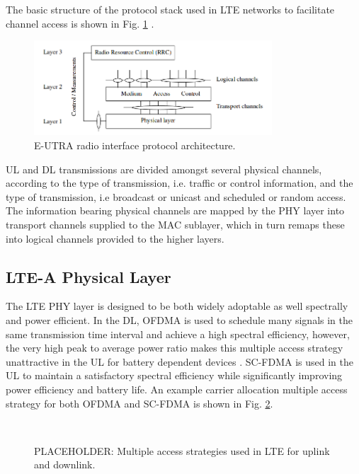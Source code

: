 The basic structure of the protocol stack used in LTE networks to facilitate channel access is shown in Fig. \ref{figs:stack} \cite{tr36201}.
\begin{figure}[!ht]
	\centering
	\includegraphics[width=3.5in]{figures3/protocolStack}
	\caption{E-UTRA radio interface protocol architecture.}
	\label{figs:stack}
\end{figure}
UL and DL transmissions are divided amongst several physical channels, according to the type of transmission, i.e. traffic or control information, and the type of transmission, i.e broadcast or unicast and scheduled or random access. The information bearing physical channels are mapped by the PHY layer into transport channels supplied to the MAC sublayer, which in turn remaps these into logical channels provided to the higher layers. 

\subsection{LTE-A Physical Layer}
\label{lte-phy}
The LTE PHY layer is designed to be both widely adoptable as well spectrally and power efficient.  In the DL, OFDMA is used to schedule many signals in the same transmission time interval and achieve a high spectral efficiency, however, the very high peak to average power ratio makes this multiple access strategy unattractive in the UL for battery dependent devices \cite{tr36201}\cite{tr36211}.  SC-FDMA is used in the UL to maintain a satisfactory spectral efficiency while significantly improving power efficiency and battery life. An example carrier allocation multiple access strategy for both OFDMA and SC-FDMA is shown in Fig. \ref{lte:of-sc-fdma}.

\begin{figure}[!ht] 
	\centering
	\\
	\caption{PLACEHOLDER: Multiple access strategies used in LTE for uplink and downlink.}
	\label{lte:of-sc-fdma}
\end{figure} 


